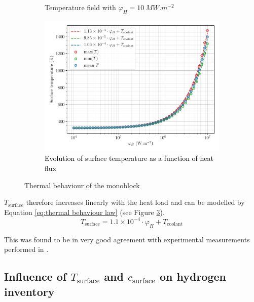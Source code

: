 \begin{figure} [h!]
\begin{subfigure}{0.4\linewidth}
        \caption{Temperature field with $\varphi_H = \SI{10}{MW.m^{-2}}$}
        \label{fig:T field 10 MW}
    \end{subfigure}
    \begin{subfigure}{0.7\linewidth}
        \centering
        \includegraphics[width=\linewidth]{Figures/Chapter3/monoblocks/parametric_study/temperature_phi_H.pdf}
        \caption{\textcolor{black}{Evolution of surface temperature as a function of heat flux}}
        \label{fig:T phi_H}
    \end{subfigure}
    \caption{Thermal behaviour of the monoblock}
\end{figure}

$T_\mathrm{surface}$ \textcolor{black}{therefore} increases linearly with the heat load and can be modelled by Equation \ref{eq:thermal behaviour law} (see Figure \ref{fig:T phi_H}).
\begin{equation}
    T_\mathrm{surface} = 1.1 \times 10^{-4} \cdot \varphi_H + T_\mathrm{coolant}
    \label{eq:thermal behaviour law}
\end{equation}

This was found to be in very good agreement with experimental measurements performed in .

\subsection{Influence of \texorpdfstring{$T_\mathrm{surface}$}{Tsurface} and \texorpdfstring{$c_\mathrm{surface}$}{csurface} on hydrogen inventory}


